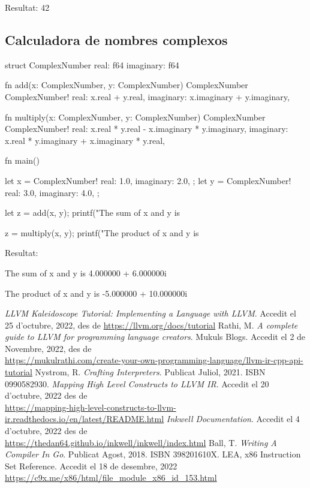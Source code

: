 ﻿\documentclass{article}
\begin{document}
Resultat: 42

\subsection{Calculadora de nombres complexos}
\begin{code}
struct ComplexNumber {
    real:      f64
    imaginary: f64
}

fn add(x: ComplexNumber, y: ComplexNumber) ComplexNumber {
    ComplexNumber!{
        real: x.real + y.real,
        imaginary: x.imaginary + y.imaginary,
    }
}

fn multiply(x: ComplexNumber, y: ComplexNumber) ComplexNumber {
    ComplexNumber!{
        real: x.real * y.real - x.imaginary * y.imaginary,
        imaginary: x.real * y.imaginary + x.imaginary * y.real,
    }
}

fn main() {
    let x = ComplexNumber!{
        real: 1.0,
        imaginary: 2.0,
    };
    let y = ComplexNumber!{
        real: 3.0,
        imaginary: 4.0,
    };

    let z = add(x, y);
    printf("The sum of x and y is %

    z = multiply(x, y);
    printf("The product of x and y is %
}
\end{code}
Resultat: 

The sum of x and y is 4.000000 + 6.000000i

The product of x and y is -5.000000 + 10.000000i

\newpage
\renewcommand\refname{Bibliografia}
\begin{thebibliography}{9}

 \textit{LLVM Kaleidoscope Tutorial: Implementing a Language with LLVM}. Accedit el 25 d'octubre, 2022, des de \url{https://llvm.org/docs/tutorial}
 Rathi, M. \textit{A complete guide to LLVM for programming language creators}. Mukuls Blogs. Accedit el 2 de Novembre, 2022, des de \\\url{https://mukulrathi.com/create-your-own-programming-language/llvm-ir-cpp-api-tutorial}
 Nystrom, R. \textit{Crafting Interpreters}. Publicat Juliol, 2021. ISBN 0990582930.
 \textit{Mapping High Level Constructs to LLVM IR}. Accedit el 20 d'octubre, 2022 des de \\\url{https://mapping-high-level-constructs-to-llvm-ir.readthedocs.io/en/latest/README.html}
 \textit{Inkwell Documentation}. Accedit el 4 d'octubre, 2022 des de \\\url{https://thedan64.github.io/inkwell/inkwell/index.html}
 Ball, T. \textit{Writing A Compiler In Go}. Publicat Agost, 2018. ISBN 398201610X.
 LEA, x86 Instruction Set Reference. Accedit el 18 de desembre, 2022 \\\url{https://c9x.me/x86/html/file_module_x86_id_153.html}

\end{thebibliography}
\end{document}

